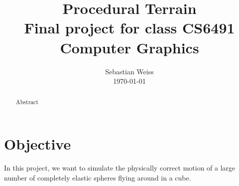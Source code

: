 \documentclass[journal, letterpaper]{IEEEtran}
\begin{document}
\title{Procedural Terrain \\
	{\large Final project for class CS6491 Computer Graphics}}
\author{Sebastian Weiss \\ \today}

\maketitle


\begin{abstract}
	Abstract
\end{abstract}

\section{Objective}
In this project, we want to simulate the physically correct motion of a large number of completely elastic spheres flying around in a cube.
\end{document}
